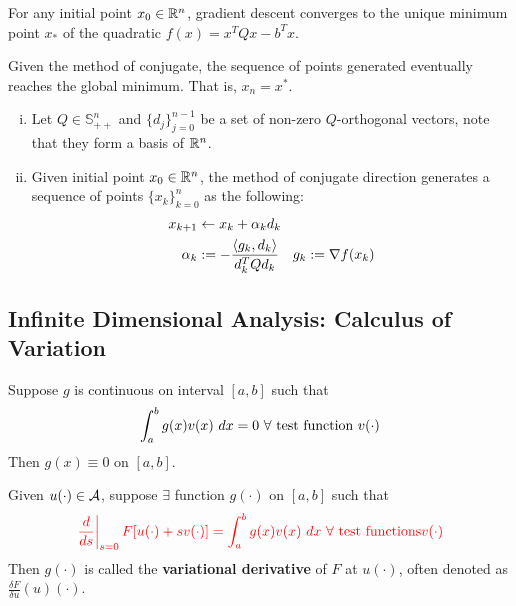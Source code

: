 \documentclass{article}
\begin{document}
    \begin{theorem}
        For any initial point $x_0 \in \mathbb{R}^n$, gradient descent converges to the unique minimum point $x_*$ of the quadratic $f(x) = x^T Q x - b^T x$.
    \end{theorem}

    \begin{theorem}
        Given the method of conjugate, the sequence of points generated eventually reaches the global minimum. That is, $x_n = x^*$.
    \end{theorem}

    \begin{algorithm} \quad
        \begin{enumerate}[(i)]
            \item Let $Q \in \mathbb{S}_{++}^n$ and $\{d_j\}_{j=0}^{n-1}$ be a set of non-zero $Q$-orthogonal vectors, note that they form a basis of $\mathbb{R}^n$. \\
            \item Given initial point $x_0 \in \mathbb{R}^n$, the method of conjugate direction generates a sequence of points $\{x_k\}_{k=0}^n$ as the following:
            \begin{align}
                x_{k+1} &\leftarrow x_k + \alpha_k d_k \\
                \alpha_k &:= - \frac{\langle {g_k}, {d_k} \rangle}{d_k^T Q d_k} \quad g_k := \nabla f(x_k)
            \end{align}
        \end{enumerate}
    \end{algorithm}

\subsection{Infinite Dimensional Analysis: Calculus of Variation}
    \begin{lemma}
        Suppose $g$ is continuous on interval $[a, b]$ such that
        \begin{align}
            \int_a^b g(x) v(x)\ dx = 0\ \forall \text{{ test function }} v(\cdot)
        \end{align}
        Then $g(x) \equiv 0$ on $[a, b]$.
    \end{lemma}

    \begin{definition}
        Given $u(\cdot) \in \mathcal{{A}}$, suppose $\exists$ function $g(\cdot)$ on $[a, b]$ such that 
        \begin{align}
            \textcolor{red}{\left. \frac{d}{ds} \right |_{s=0} F[u(\cdot) + sv(\cdot)] = \int_a^b g(x) v(x)\ dx\ \forall \text{{ test functions}} v(\cdot)}
        \end{align}
        Then $g(\cdot)$ is called the \textbf{variational derivative} of $F$ at $u(\cdot)$, often denoted as $\frac{\delta F}{\delta u}(u)(\cdot)$.
    \end{definition}
\end{document}

